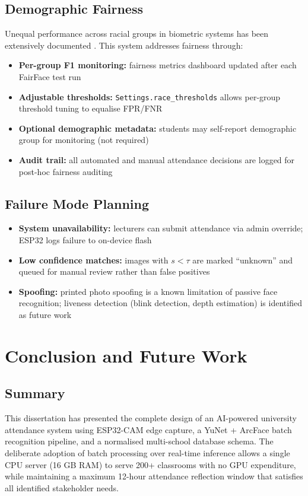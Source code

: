 \documentclass[12pt,a4paper]{report}
\begin{document}
\section{Demographic Fairness}
Unequal performance across racial groups in biometric systems has been extensively documented \cite{buolamwini2018gender,grother2019frvt}. This system addresses fairness through:

\begin{itemize}
  \item \textbf{Per-group F1 monitoring:} fairness metrics dashboard updated after each FairFace test run
  \item \textbf{Adjustable thresholds:} \texttt{Settings.race\_thresholds} allows per-group threshold tuning to equalise FPR/FNR
  \item \textbf{Optional demographic metadata:} students may self-report demographic group for monitoring (not required)
  \item \textbf{Audit trail:} all automated and manual attendance decisions are logged for post-hoc fairness auditing
\end{itemize}

\section{Failure Mode Planning}
\begin{itemize}
  \item \textbf{System unavailability:} lecturers can submit attendance via admin override; ESP32 logs failure to on-device flash
  \item \textbf{Low confidence matches:} images with $s < \tau$ are marked ``unknown'' and queued for manual review rather than false positives
  \item \textbf{Spoofing:} printed photo spoofing is a known limitation of passive face recognition; liveness detection (blink detection, depth estimation) is identified as future work
\end{itemize}

\chapter{Conclusion and Future Work}

\section{Summary}
This dissertation has presented the complete design of an AI-powered university attendance system using ESP32-CAM edge capture, a YuNet + ArcFace batch recognition pipeline, and a normalised multi-school database schema. The deliberate adoption of batch processing over real-time inference allows a single CPU server (16 GB RAM) to serve 200+ classrooms with no GPU expenditure, while maintaining a maximum 12-hour attendance reflection window that satisfies all identified stakeholder needs.
\end{document}
